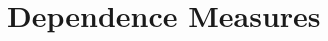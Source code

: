 \documentclass[11pt]{article}
\providecommand{\sct}[1]{{\sc \texttt{#1}}}
\newcommand{\subfigimg}[3][,]{%
  \setbox1=\hbox{\texttt{[image: \#3]}}%
  \leavevmode\rlap{\usebox1}%
  \rlap{\hspace*{12pt}\raisebox{\dimexpr\ht1-0\baselineskip}{#2}}%
  \phantom{\usebox1}%
}
\newcommand{\Mgc}{\sct{Mgc}}
\begin{document}


\section{Dependence Measures}
\label{appen:methods}
\end{document}
